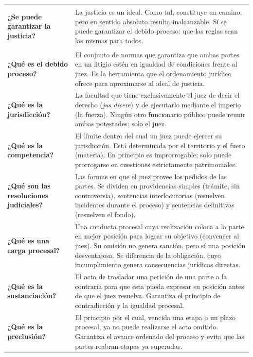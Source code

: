 \documentclass[12pt,oneside]{book}
\begin{document}
\begin{longtable}{
    >{\bfseries\raggedright\arraybackslash}p{}
    p{}
}
\textbf{¿Se puede garantizar la justicia?} &
La justicia es un ideal. Como tal, constituye un camino, pero en sentido absoluto resulta inalcanzable. Sí se puede garantizar el debido proceso: que las reglas sean las mismas para todos. \\

\textbf{¿Qué es el debido proceso?} &
El conjunto de normas que garantiza que ambas partes en un litigio estén en igualdad de condiciones frente al juez. Es la herramienta que el ordenamiento jurídico ofrece para aproximarse al ideal de justicia. \\

\textbf{¿Qué es la jurisdicción?} &
La facultad que tiene exclusivamente el juez de decir el derecho (\emph{jus dicere}) y de ejecutarlo mediante el imperio (la fuerza). Ningún otro funcionario público puede reunir ambas potestades: solo el juez. \\

\textbf{¿Qué es la competencia?} &
El límite dentro del cual un juez puede ejercer su jurisdicción. Está determinada por el territorio y el fuero (materia). En principio es improrrogable; solo puede prorrogarse en cuestiones estrictamente patrimoniales. \\

\textbf{¿Qué son las resoluciones judiciales?} &
Las formas en que el juez provee los pedidos de las partes. Se dividen en providencias simples (trámite, sin controversia), sentencias interlocutorias (resuelven incidentes durante el proceso) y sentencias definitivas (resuelven el fondo). \\

\textbf{¿Qué es una carga procesal?} &
Una conducta procesal cuya realización coloca a la parte en mejor posición para lograr su objetivo (convencer al juez). Su omisión no genera sanción, pero sí una posición desventajosa. Se diferencia de la obligación, cuyo incumplimiento genera consecuencias jurídicas directas. \\

\textbf{¿Qué es la sustanciación?} &
El acto de trasladar una petición de una parte a la contraria para que esta pueda expresar su posición antes de que el juez resuelva. Garantiza el principio de contradicción y la igualdad procesal. \\

\textbf{¿Qué es la preclusión?} &
El principio por el cual, vencida una etapa o un plazo procesal, ya no puede realizarse el acto omitido. Garantiza el avance ordenado del proceso y evita que las partes reabran etapas ya superadas. \\


\end{longtable}
\end{document}
